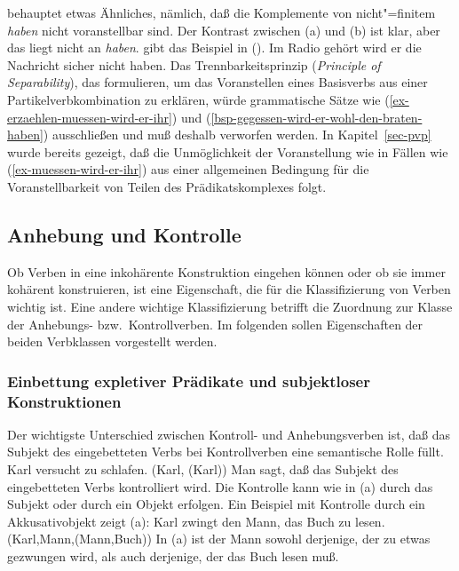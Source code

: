 \noindent
\citet[]{Haider93a} behauptet etwas Ähnliches, nämlich, daß
die Komplemente von nicht"=finitem \emph{haben} nicht voranstellbar sind.
\eal
{}
\zl
Der Kontrast zwischen (a) und (b) ist klar, aber das liegt nicht
an \emph{haben}. \citet[]{Meurers2000b} gibt das Beispiel
in ().
\ea
Im Radio gehört wird er die Nachricht sicher nicht haben.
\z
Das Trennbarkeitsprinzip (\textit{Principle of Separability\/}),
das \citet[]{SW94a}
formulieren, um das Voranstellen eines Basisverbs aus einer Partikelverbkombination
zu erklären, würde grammatische Sätze wie (\ref{ex-erzaehlen-muessen-wird-er-ihr}) 
und (\ref{bsp-gegessen-wird-er-wohl-den-braten-haben}) ausschließen und muß deshalb verworfen werden.
In Kapitel~\ref{sec-pvp} wurde bereits gezeigt, daß die Unmöglichkeit der
Voranstellung wie in Fällen wie (\ref{ex-muessen-wird-er-ihr}) aus einer allgemeinen
Bedingung für die Voranstellbarkeit von Teilen des Prädikatskomplexes folgt.



\subsection{Anhebung und Kontrolle}
\label{sec-anhebung}

Ob Verben in eine inkohärente Konstruktion eingehen können
oder ob sie immer kohärent konstruieren, ist eine Eigenschaft, die für die Klassifizierung
von Verben wichtig ist. Eine andere wichtige Klassifizierung betrifft die Zuordnung zur Klasse
der Anhebungs- bzw.\ Kontrollverben. Im folgenden sollen Eigenschaften der beiden Verbklassen 
vorgestellt werden.

\subsubsection{Einbettung expletiver Prädikate und subjektloser Konstruktionen}
\label{expl-pred-subj-constr}

Der wichtigste Unterschied zwischen Kontroll- und Anhebungsverben ist, daß das Subjekt
des eingebetteten Verbs bei Kontrollverben eine semantische Rolle füllt.
\eal
\ex Karl versucht zu schlafen.
\ex {}(Karl, (Karl))
\zl
Man sagt, daß das Subjekt des eingebetteten Verbs kontrolliert wird. Die Kontrolle
kann wie in (a) durch das Subjekt oder durch ein Objekt erfolgen. Ein Beispiel
mit Kontrolle durch ein Akkusativobjekt zeigt (a):
\eal
\ex Karl zwingt den Mann, das Buch zu lesen.
\ex {}(Karl,Mann,(Mann,Buch))
\zl
In (a) ist der Mann sowohl derjenige, der zu etwas gezwungen wird, als auch
derjenige, der das Buch lesen muß.

